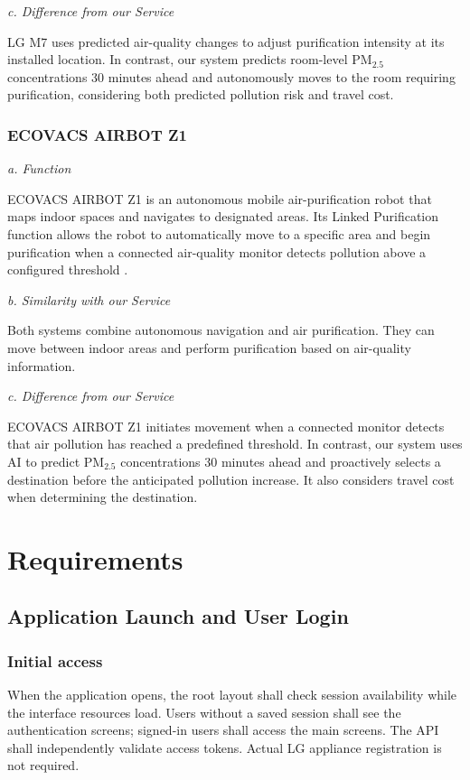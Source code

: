 \documentclass[conference]{IEEEtran}
\newcommand{\pmfine}{\ensuremath{\mathrm{PM}_{2.5}}}
\begin{document}
\emph{c. Difference from our Service}

LG M7 uses predicted air-quality changes to adjust purification intensity at its installed location. In contrast, our system predicts room-level \pmfine{} concentrations 30 minutes ahead and autonomously moves to the room requiring purification, considering both predicted pollution risk and travel cost.

\subsubsection{ECOVACS AIRBOT Z1}

\emph{a. Function}

ECOVACS AIRBOT Z1 is an autonomous mobile air-purification robot that maps indoor spaces and navigates to designated areas. Its Linked Purification function allows the robot to automatically move to a specific area and begin purification when a connected air-quality monitor detects pollution above a configured threshold \cite{ref4}.

\emph{b. Similarity with our Service}

Both systems combine autonomous navigation and air purification. They can move between indoor areas and perform purification based on air-quality information.

\emph{c. Difference from our Service}

ECOVACS AIRBOT Z1 initiates movement when a connected monitor detects that air pollution has reached a predefined threshold. In contrast, our system uses AI to predict \pmfine{} concentrations 30 minutes ahead and proactively selects a destination before the anticipated pollution increase. It also considers travel cost when determining the destination.

\section{Requirements}

\subsection{Application Launch and User Login}

\subsubsection{Initial access}

When the application opens, the root layout shall check session availability while the interface resources load. Users without a saved session shall see the authentication screens; signed-in users shall access the main screens. The API shall independently validate access tokens. Actual LG appliance registration is not required.
\end{document}
